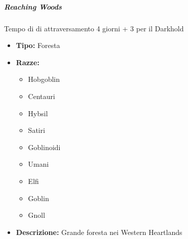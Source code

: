 \documentclass{article}
\begin{document}
\subparagraph{Reaching Woods} 
Tempo di di attraversamento 4 giorni + 3 per il Darkhold  
\begin{itemize}
    \item \textbf{Tipo:} Foresta
    \item \textbf{Razze:} 
    \begin{itemize}
        \item Hobgoblin
        \item Centauri
        \item Hybsil
        \item Satiri
        \item Goblinoidi
        \item Umani
        \item Elfi
        \item Goblin
        \item Gnoll
    \end{itemize}
    \item \textbf{Descrizione:} Grande foresta nei Western Heartlands
\end{itemize}
\end{document}
